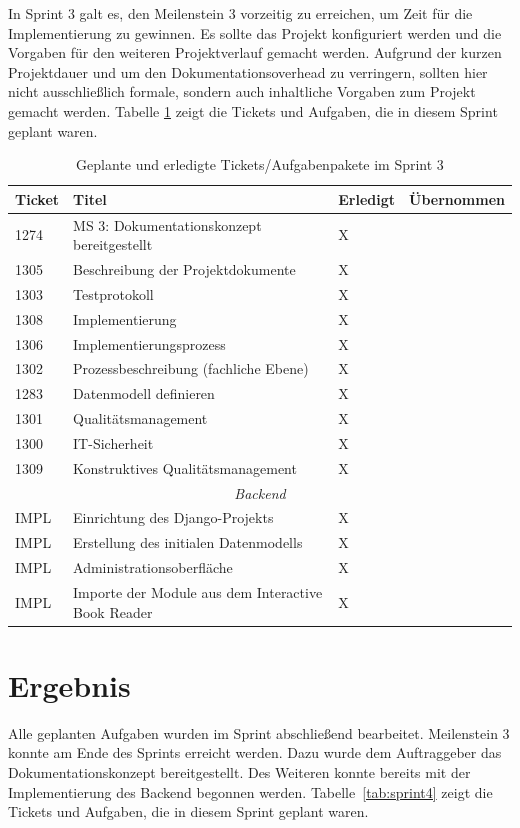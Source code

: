 \documentclass[a4paper,11pt,listof=numbered,glossary=totoc,parskip=half,toc=bib]{scrreprt}
\begin{document}
In Sprint 3 galt es, den Meilenstein 3 vorzeitig zu erreichen, um Zeit für die Implementierung zu gewinnen. Es sollte das Projekt konfiguriert werden und die Vorgaben für den weiteren Projektverlauf gemacht werden. Aufgrund der kurzen Projektdauer und um den Dokumentationsoverhead zu verringern, sollten hier nicht ausschließlich formale, sondern auch inhaltliche Vorgaben zum Projekt gemacht werden. Tabelle \ref{tab:sprint3} zeigt die Tickets und Aufgaben, die in diesem Sprint geplant waren.

\begin{table}    
    \begin{tabularx}{\textwidth}{lXll}
			\toprule
			\textbf{Ticket} & \textbf{Titel} & \textbf{Erledigt} & \textbf{Übernommen} \\
			\midrule
1274	&	MS 3: Dokumentationskonzept bereitgestellt	&	X	&		\\
1305	&	Beschreibung der Projektdokumente	&	X	&		\\
1303	&	Testprotokoll	&	X	&		\\
1308	&	Implementierung	&	X	&		\\
1306	&	Implementierungsprozess	&	X	&		\\
1302	&	Prozessbeschreibung (fachliche Ebene)	&	X	&		\\
1283	&	Datenmodell definieren	&	X	&		\\
1301	&	Qualitätsmanagement	&	X	&		\\
1300	&	IT-Sicherheit	&	X	&		\\
1309	&	Konstruktives Qualitätsmanagement	&	X	&		\\
		\midrule
		\multicolumn{4}{c}{\textit{Backend}}\\
		\midrule
IMPL	&	Einrichtung des Django-Projekts	&	X	&		\\
IMPL	&	Erstellung des initialen Datenmodells	&	X	&		\\
IMPL	&	Administrationsoberfläche	&	X	&		\\
IMPL	&	Importe der Module aus dem Interactive Book Reader	&	X	&		\\

			\bottomrule
		\end{tabularx}
\caption{Geplante und erledigte Tickets/Aufgabenpakete im Sprint 3}
\label{tab:sprint3}
\end{table}
    
    \section{Ergebnis}
    Alle geplanten Aufgaben wurden im Sprint abschließend bearbeitet. Meilenstein 3 konnte am Ende des Sprints erreicht werden. Dazu wurde dem Auftraggeber das Dokumentationskonzept bereitgestellt. Des Weiteren konnte bereits mit der Implementierung des Backend begonnen werden. Tabelle~\ref{tab:sprint4} zeigt die Tickets und Aufgaben, die in diesem Sprint geplant waren.
    
\end{document}
